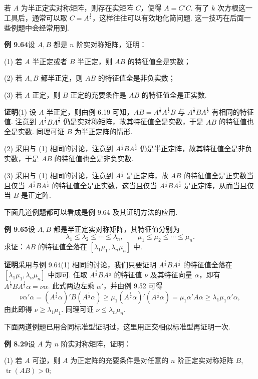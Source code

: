 \documentclass[UTF8,12pt,a4paper,fontset=fandol]{ctexart}
\begin{document}
若 $A$ 为半正定实对称矩阵，则存在实矩阵 $C$，使得 $A=C'C$. 有了 $k$ 次方根这一工具后，通常可以取 $C=A^{\frac12}$，这样往往可以有效地化简问题. 这一技巧在后面一些例题中会经常用到.

\noindent\textbf{例 9.64}\quad 设 $A,B$ 都是 $n$ 阶实对称矩阵，证明：

(1) 若 $A$ 半正定或者 $B$ 半正定，则 $AB$ 的特征值全是实数；

(2) 若 $A,B$ 都半正定，则 $AB$ 的特征值全是非负实数；

(3) 若 $A$ 正定，则 $B$ 正定的充要条件是 $AB$ 的特征值全是正实数.

\noindent\textbf{证明}\quad (1) 设 $A$ 半正定，则由例 6.19 可知，$AB=A^{\frac12}A^{\frac12}B$ 与 $A^{\frac12}BA^{\frac12}$ 有相同的特征值. 注意到 $A^{\frac12}BA^{\frac12}$ 仍是实对称矩阵，故其特征值全是实数，于是 $AB$ 的特征值也全是实数. 同理可证 $B$ 为半正定阵的情形.

(2) 采用与 (1) 相同的讨论，注意到 $A^{\frac12}BA^{\frac12}$ 仍是半正定阵，故其特征值全是非负实数，于是 $AB$ 的特征值也全是非负实数.

(3) 采用与 (1) 相同的讨论，注意到 $A^{\frac12}$ 是正定阵，故 $AB$ 的特征值全是正实数当且仅当 $A^{\frac12}BA^{\frac12}$ 的特征值全是正实数，这当且仅当 $A^{\frac12}BA^{\frac12}$ 是正定阵，从而当且仅当 $B$ 是正定阵.

下面几道例题都可以看成是例 9.64 及其证明方法的应用.

\noindent\textbf{例 9.65}\quad 设 $A,B$ 都是半正定实对称矩阵，其特征值分别为
\[
\lambda_1\le\lambda_2\le\cdots\le\lambda_n,\qquad
\mu_1\le\mu_2\le\cdots\le\mu_n.
\]
求证：$AB$ 的特征值全落在 $[\lambda_1\mu_1,\lambda_n\mu_n]$ 中.

\noindent\textbf{证明}\quad 采用与例 9.64(1) 相同的讨论，我们只要证明 $A^{\frac12}BA^{\frac12}$ 的特征值全落在 $[\lambda_1\mu_1,\lambda_n\mu_n]$ 中即可. 任取 $A^{\frac12}BA^{\frac12}$ 的特征值 $\nu$ 及其特征向量 $\alpha$，即有 $A^{\frac12}BA^{\frac12}\alpha=\nu\alpha$. 此式两边左乘 $\alpha'$，并由例 9.52 可得
\[
\nu\alpha'\alpha=(A^{\frac12}\alpha)'B(A^{\frac12}\alpha)\ge\mu_1(A^{\frac12}\alpha)'(A^{\frac12}\alpha)=\mu_1\alpha'A\alpha\ge\lambda_1\mu_1\alpha'\alpha,
\]
由此即得 $\nu\ge\lambda_1\mu_1$. 同理可证 $\nu\le\lambda_n\mu_n$.

下面两道例题已用合同标准型证明过，这里用正交相似标准型再证明一次.

\noindent\textbf{例 8.29}\quad 设 $A$ 为 $n$ 阶实对称矩阵，证明：

(1) 若 $A$ 可逆，则 $A$ 为正定阵的充要条件是对任意的 $n$ 阶正定实对称矩阵 $B$, $\operatorname{tr}(AB)>0$;
\end{document}
